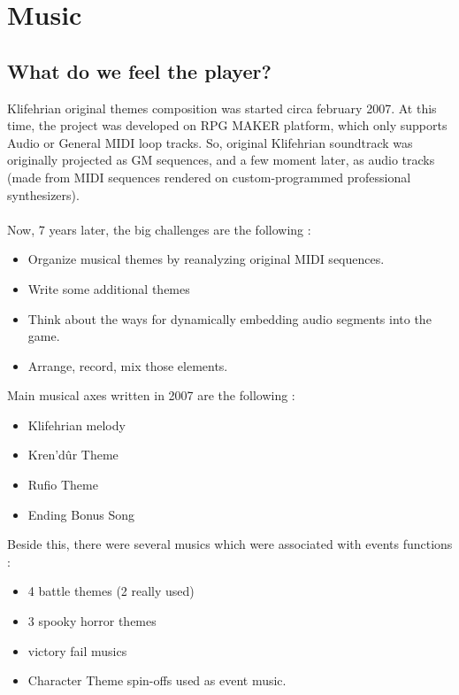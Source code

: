 \documentclass[a4paper,12pt]{book}
\begin{document}
\part{Music}
\chapter{What do we feel the player?}
Klifehrian original themes composition was started circa february 2007. At this time, the project was developed on RPG MAKER platform, which only supports Audio or General MIDI loop tracks. So, original Klifehrian soundtrack was originally projected as GM sequences, and a few moment later, as audio tracks (made from MIDI sequences rendered on custom-programmed professional synthesizers).
\\ \\
Now, 7 years later, the big challenges are the following :
\begin{itemize}
\item Organize musical themes by reanalyzing original MIDI sequences.
\item Write some additional themes
\item Think about the ways for dynamically embedding audio segments into the game.
\item Arrange, record, mix those elements.
\end{itemize}
Main musical axes written in 2007 are the following :
\begin{itemize}
\item Klifehrian melody
\item Kren'd\^ur Theme
\item Rufio Theme
\item Ending Bonus Song
\end{itemize}
\newpage Beside this, there were several musics which were associated with events \/ functions :
\begin{itemize}
\item 4 battle themes (2 really used)
\item 3 spooky \/ horror themes
\item victory \/ fail musics
\item Character Theme spin-offs used as event music.
\end{itemize}
\end{document}
